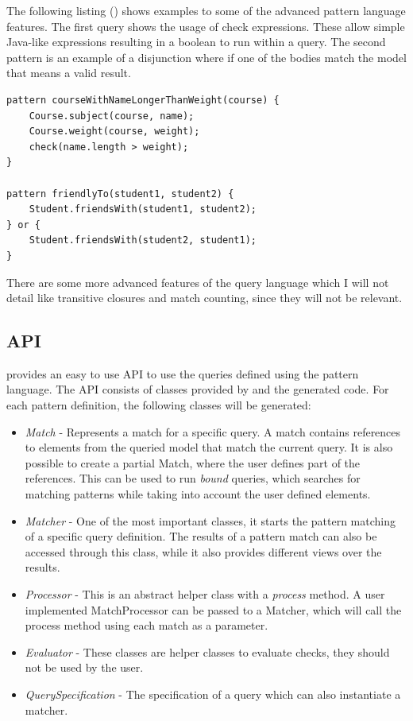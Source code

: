 The following listing () shows examples to some of
the advanced pattern language features. The first query shows the usage of check
expressions. These allow simple Java-like expressions resulting in a boolean to
run within a query. The second pattern is an example of a disjunction where if
one of the bodies match the model that means a valid result.

\begin{lstlisting}[frame=single, language=IQPL,
label=listing:AdvancedIQPLExamples, caption=Advanced queries] 
pattern courseWithNameLongerThanWeight(course) {
	Course.subject(course, name);
	Course.weight(course, weight);
	check(name.length > weight); 
}

pattern friendlyTo(student1, student2) {
	Student.friendsWith(student1, student2);
} or {
	Student.friendsWith(student2, student1);
}
\end{lstlisting}

There are some more advanced features of the query language which I will not
detail like transitive closures and match counting, since they will not be
relevant.

\subsection{\EIQ{} API}

\EIQ{} provides an easy to use API to use the queries defined using the pattern
language. The API consists of classes provided by \EIQ{} and the generated code.
For each pattern definition, the following classes will be generated:

\begin{itemize}
  \item \emph{Match} - Represents a match for a specific query. A match contains
  references to elements from the queried model that match the current query.
  It is also possible to create a partial Match, where the user defines part of
  the references. This can be used to run \emph{bound} queries, which searches
  for matching patterns while taking into account the user defined elements.
  \item \emph{Matcher} - One of the most important classes, it starts the
  pattern matching of a specific query definition. The results of a pattern
  match can also be accessed through this class, while it also provides
  different views over the results.
  \item \emph{Processor} - This is an abstract helper class with a
  \emph{process} method. A user implemented MatchProcessor can be passed to a
  Matcher, which will call the process method using each match as a parameter.
  \item \emph{Evaluator} - These classes are helper classes to evaluate checks,
  they should not be used by the user.
  \item \emph{QuerySpecification} - The specification of a query which can also
  instantiate a matcher.
\end{itemize}

